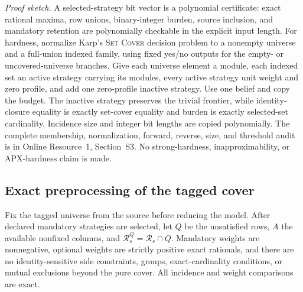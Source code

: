 \noindent\emph{Proof sketch.}
A selected-strategy bit vector is a polynomial certificate: exact rational
maxima, row unions, binary-integer burden, source inclusion, and mandatory
retention are polynomially checkable in the explicit input length.  For
hardness, normalize Karp's \textsc{Set Cover} decision problem
\citep{Karp1972} to a nonempty universe and a full-union indexed family, using
fixed yes/no outputs for the empty- or uncovered-universe branches.  Give each
universe element a module, each indexed set an active strategy carrying its
modules, every active strategy unit weight and zero profile, and add one
zero-profile inactive strategy.  Use one belief and copy the budget.  The
inactive strategy preserves the trivial frontier, while identity-closure
equality is exactly set-cover equality and burden is exactly selected-set
cardinality.  Incidence size and integer bit lengths are copied polynomially.
The complete membership, normalization, forward, reverse, size, and threshold
audit is in Online Resource~1, Section~S3.  No strong-hardness,
inapproximability, or APX-hardness claim is made.

\subsection{Exact preprocessing of the tagged cover}
\label{subsec:aor-preprocessing}

Fix the tagged universe from the source before reducing the model.  After
declared mandatory strategies are selected, let \(Q\) be the unsatisfied rows,
\(A\) the available nonfixed columns, and
\(\mathcal R_s^Q=\mathcal R_s\cap Q\).  Mandatory weights are nonnegative,
optional weights are strictly positive exact rationals, and there are no
identity-sensitive side constraints, groups, exact-cardinality conditions, or
mutual exclusions beyond the pure cover.  All incidence and weight
comparisons are exact.

